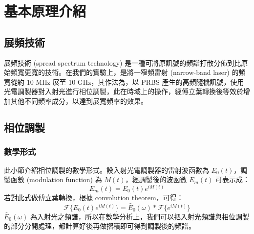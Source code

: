 \documentclass[class=NCU_thesis, crop=false]{standalone}
\begin{document}
\chapter{基本原理介紹}

\section{展頻技術}

展頻技術 (spread spectrum technology) 是一種可將原訊號的頻譜打散分佈到比原始頻寬更寬的技術。在我們的實驗上，是將一窄頻雷射 (narrow-band laser) 的頻寬從約 10 MHz 展至 10 GHz，其作法為，以 PRBS 產生的高頻隨機訊號，使用光電調製器對入射光進行相位調製，此在時域上的操作，經傅立葉轉換後等效於增加其他不同頻率成分，以達到展寬頻率的效果。
\section{相位調製}

\subsection{數學形式}
此小節介紹相位調製的數學形式。設入射光電調製器的雷射波函數為 $E_{0}(t)$，調製函數 (modulation function) 為 $M(t)$，經調製後的波函數 $E_{m}(t)$ 可表示成：
\begin{equation}
    E_{m}(t)=E_{0}(t)e^{iM(t)}
\end{equation}
若對此式做傅立葉轉換，根據 convolution theorem，可得：
\begin{equation}
\label{eq:modulation_function}
    \mathscr{F}\{E_{0}(t)e^{iM(t)}\}=\tilde{E_{0}}(\omega)*\mathscr{F}\{{e^{iM(t)}}\}
\end{equation}
$\tilde{E_{0}}(\omega)$ 為入射光之頻譜，所以在數學分析上，我們可以把入射光頻譜與相位調製的部分分開處理，都計算好後再做摺積即可得到調製後的頻譜。
\end{document}
